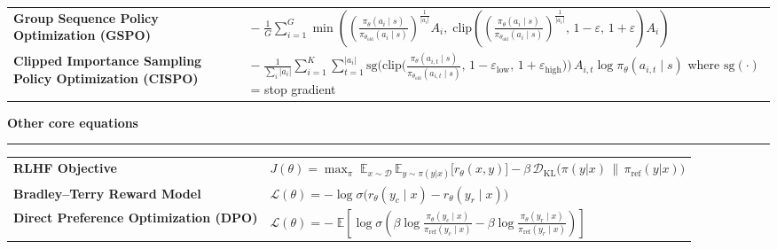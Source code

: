 \documentclass[9pt]{extarticle}
\begin{document}
\begin{center}
\begin{tabularx}{0.92\textwidth}{>{\raggedright\arraybackslash\bfseries}p{5.8cm} @{\quad} X}
Group Sequence Policy Optimization
\newline\mdseries (GSPO)
&
$\displaystyle -\;\frac{1}{G}\sum_{i=1}^{G}\min\!\left(\!\left(\frac{\pi_\theta(a_i\mid s)}{\pi_{\theta_{\text{old}}}(a_i\mid s)}\right)^{\!\frac{1}{|a_i|}} A_i,\; \mathrm{clip}\!\left(\!\left(\frac{\pi_\theta(a_i\mid s)}{\pi_{\theta_{\text{old}}}(a_i\mid s)}\right)^{\!\frac{1}{|a_i|}},\, 1\!-\!\varepsilon,\, 1\!+\!\varepsilon\right) A_i\right)$
\\[30pt]

Clipped Importance Sampling Policy Optimization
\newline\mdseries (CISPO)
&
$\displaystyle -\;\frac{1}{\sum_i |a_i|}\sum_{i=1}^{K}\sum_{t=1}^{|a_i|} \mathrm{sg}\!\Big(\mathrm{clip}\big(\tfrac{\pi_\theta(a_{i,t}\mid s)}{\pi_{\theta_{\text{old}}}(a_{i,t}\mid s)},\, 1\!-\!\varepsilon_{\text{low}},\, 1\!+\!\varepsilon_{\text{high}}\big)\Big)\, A_{i,t} \log \pi_\theta(a_{i,t}\mid s)$
\newline
where $\mathrm{sg}(\cdot)$ = stop gradient
\\
\end{tabularx}
\end{center}

\vspace{6pt}
{\centering\textbf{Other core equations}\par}
\vspace{2pt}
\hrule
\vspace{6pt}

\begin{center}
\begin{tabularx}{0.92\textwidth}{>{\raggedright\arraybackslash\bfseries}p{5.8cm} @{\quad} X}

RLHF Objective
&
$\displaystyle J(\theta) = \max_{\pi}\; \mathbb{E}_{x \sim \mathcal{D}}\,\mathbb{E}_{y \sim \pi(y|x)} \Big[r_\theta(x, y)\Big] - \beta\, \mathcal{D}_{\text{KL}}\!\Big(\pi(y|x) \,\|\, \pi_{\text{ref}}(y|x)\Big)$
\\[14pt]

Bradley--Terry
\newline Reward Model
&
$\displaystyle \mathcal{L}(\theta) = -\log \sigma\!\Big( r_{\theta}(y_c \mid x) - r_{\theta}(y_r \mid x) \Big)$
\\[14pt]

Direct Preference Optimization
\newline\mdseries (DPO)
&
$\displaystyle \mathcal{L}(\theta) = -\;\mathbb{E}\!\left[ \log \sigma\!\left( \beta \log \frac{\pi_{\theta}(y_c \mid x)}{\pi_{\text{ref}}(y_c \mid x)} - \beta \log \frac{\pi_{\theta}(y_r \mid x)}{\pi_{\text{ref}}(y_r \mid x)} \right) \right]$
\\
\end{tabularx}
\end{center}
\end{document}
